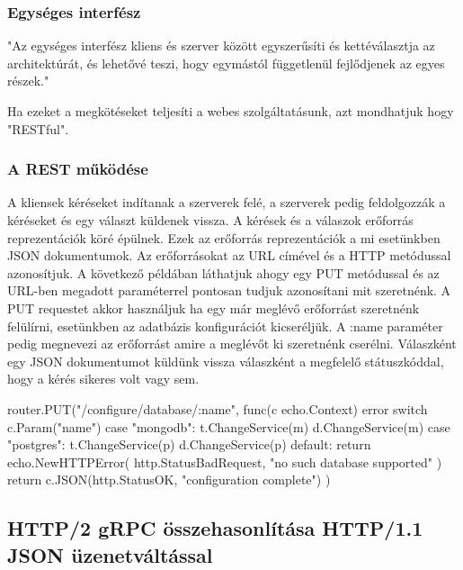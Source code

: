 \subsubsection{Egységes interfész}
"Az egységes interfész kliens és szerver között egyszerűsíti és kettéválasztja az architektúrát, és lehetővé teszi, hogy egymástól függetlenül fejlődjenek az egyes részek."


Ha ezeket a megkötéseket teljesíti a webes szolgáltatásunk, azt mondhatjuk hogy "RESTful".


\subsubsection{A REST működése}
A kliensek kéréseket indítanak a szerverek felé, a szerverek pedig feldolgozzák a kéréseket és egy választ küldenek vissza.
A kérések és a válaszok erőforrás reprezentációk köré épülnek.
Ezek az erőforrás reprezentációk a mi esetünkben JSON dokumentumok.
Az erőforrásokat az URL címével és a HTTP metódussal azonosítjuk.
A következő példában láthatjuk ahogy egy PUT metódussal és az URL-ben megadott paraméterrel pontosan tudjuk azonosítani mit szeretnénk.
A PUT requestet akkor használjuk ha egy már meglévő erőforrást szeretnénk felülírni, esetünkben az adatbázis konfigurációt kicseréljük.
A :name paraméter pedig megnevezi az erőforrást amire a meglévőt ki szeretnénk cserélni.
Válaszként egy JSON dokumentumot küldünk vissza válaszként a megfelelő státuszkóddal, hogy a kérés sikeres volt vagy sem.

\begin{python}
    router.PUT("/configure/database/:name", func(c echo.Context) error {
        switch c.Param("name") {
            case "mongodb":
            t.ChangeService(m)
            d.ChangeService(m)
            case "postgres":
            t.ChangeService(p)
            d.ChangeService(p)
            default:
            return echo.NewHTTPError(
            http.StatusBadRequest,
            "no such database supported"
            )
        }
        return c.JSON(http.StatusOK, "configuration complete")
    })
\end{python}


\subsection{HTTP/2 gRPC összehasonlítása HTTP/1.1 JSON üzenetváltással}

